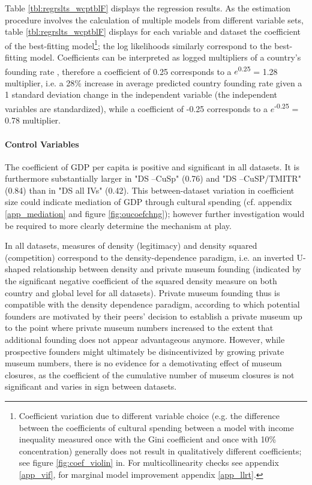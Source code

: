 \documentclass[11pt]{article}
\begin{document}
Table \ref{tbl:regrslts_wcptblF} displays the regression results. 
As the estimation procedure involves the calculation of multiple models from different variable sets, table \ref{tbl:regrslts_wcptblF} displays for each variable and dataset the coefficient of the best-fitting model\footnote{Coefficient variation due to different variable choice (e.g. the difference between the coefficients of cultural spending between a model with income inequality measured once with the Gini coefficient and once with 10\% concentration) generally does not result in qualitatively different coefficients; see figure \ref{fig:coef_violin} in. For multicollinearity checks see appendix \ref{app_vif}, for marginal model improvement appendix \ref{app_llrt}.}; the log likelihoods similarly correspond to the best-fitting model. 
Coefficients can be interpreted as logged multipliers of a country's founding rate \parencite{Coxe_West_Aiken_2009_count}, therefore a coefficient of 0.25 corresponds to a \(e\)\textsuperscript{0.25} = 1.28 multiplier, i.e. a 28\% increase in average predicted country founding rate given a 1 standard deviation change in the independent variable (the independent variables are standardized), while a coefficient of -0.25 corresponds to a \(e\)\textsuperscript{-0.25} = 0.78 multiplier.
\FloatBarrier

\paragraph*{Control Variables}





The coefficient of GDP per capita is positive and significant in all datasets. 
It is furthermore substantially larger in "DS --CuSp" (0.76) and "DS --CuSP/TMITR" (0.84) than in "DS all IVs" (0.42).
This between-dataset variation in coefficient size could indicate mediation of GDP through cultural spending (cf. appendix \ref{app_mediation} and figure \ref{fig:oucoefchng}); however further investigation would be required to more clearly determine the mechanism at play. 





In all datasets, measures of density (legitimacy) and density squared (competition) correspond to the density-dependence paradigm, i.e. an inverted U-shaped relationship between density and private museum founding (indicated by the significant negative coefficient of the squared density measure on both country and global level for all datasets). 
Private museum founding thus is compatible with the density dependence paradigm, according to which potential founders are motivated by their peers' decision to establish a private museum up to the point where private museum numbers increased to the extent that additional founding does not appear advantageous anymore. 
However, while prospective founders might ultimately be disincentivized by growing private museum numbers, there is no evidence for a demotivating effect of  museum closures, as the coefficient of the cumulative number of museum closures is not significant and varies in sign between datasets.
\end{document}
